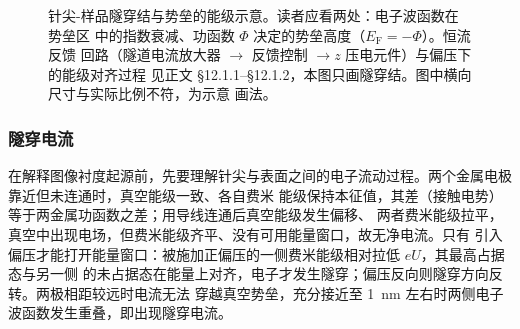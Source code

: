 \begin{figure}[htbp]
\caption{针尖-样品隧穿结与势垒的能级示意。读者应看两处：电子波函数在势垒区
中的指数衰减、功函数 $\Phi$ 决定的势垒高度（$E_{\mathrm{F}}=-\Phi$）。恒流反馈
回路（隧道电流放大器 $\to$ 反馈控制 $\to z$ 压电元件）与偏压下的能级对齐过程
见正文 §12.1.1--§12.1.2，本图只画隧穿结。图中横向尺寸与实际比例不符，为示意
画法。\schemamark{}}
\label{fig:stm-junction}
\end{figure}

\subsubsection{隧穿电流}

在解释图像衬度起源前，先要理解针尖与表面之间的电子流动过程。两个金属电极靠近但未连通时，真空能级一致、各自费米
能级保持本征值，其差（接触电势）等于两金属功函数之差；用导线连通后真空能级发生偏移、
两者费米能级拉平，真空中出现电场，但费米能级齐平、没有可用能量窗口，故无净电流。只有
引入偏压才能打开能量窗口：被施加正偏压的一侧费米能级相对拉低 $eU$，其最高占据态与另一侧
的未占据态在能量上对齐，电子才发生隧穿；偏压反向则隧穿方向反转。两极相距较远时电流无法
穿越真空势垒，充分接近至 \qty{1}{nm} 左右时两侧电子波函数发生重叠，即出现隧穿电流。

